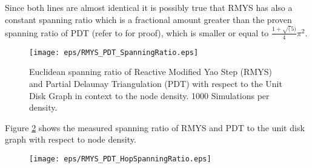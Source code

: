 Since both lines are almost identical it is possibly true that RMYS has also a constant spanning ratio which is a fractional amount greater than the proven spanning ratio of PDT (refer to \cite{Neumann2012} for proof), which is smaller or equal to $\frac{1+\sqrt(5)}{4} \pi^2 $. 

\begin{figure}[h!]
\centering
\texttt{[image: eps/RMYS\_PDT\_SpanningRatio.eps]}
\caption{Euclidean spanning ratio of Reactive Modified Yao Step (RMYS) and Partial Delaunay Triangulation (PDT) with respect to the Unit Disk Graph in context to the node density. 1000 Simulations per density.}
\label{fig:RMYS_PDT_SpanningRatio}
\end{figure}


Figure \ref{fig:RMYS_PDT_HopSpanningRatio} shows the measured spanning ratio of RMYS and PDT to the unit disk graph with respect to node density.


\begin{figure}[h!]
\centering
\texttt{[image: eps/RMYS\_PDT\_HopSpanningRatio.eps]}
\caption{}
\label{fig:RMYS_PDT_HopSpanningRatio}
\end{figure}







